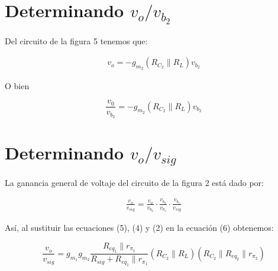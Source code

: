 \documentclass[12pt]{article}
\begin{document}
	\section*{Determinando $v_o / v_{b_2}$}
	Del circuito de la figura 5 tenemos que:
	
	\begin{align*}
		v_o = -g_{m_2} \left( R_{C_2} \parallel R_L \right)v_{b_2}
	\end{align*} 
	
	\noindent O bien
	\begin{tcolorbox}[colback=red!5!white,colframe=red!75!black,arc=0mm,boxrule=0mm,width=(\linewidth+0.5cm)]
		\begin{equation}
			\frac{v_0}{v_{b_2}} = -g_{m_2} \left( R_{C_2} \parallel R_L \right)v_{b_2}
		\end{equation}
	\end{tcolorbox}
	
	\section*{Determinando $v_o / v_{sig}$}
	La ganancia general de voltaje del circuito de la figura 2 está dado por:
	
	\begin{align}
		\frac{v_o}{v_{sig}} = \frac{v_o}{v_{b_2}} \cdot \frac{v_{b_2}}{v_{b_1}} \cdot \frac{v_{b_1}}{v_{sig}}	
	\end{align}
	
	\noindent Así, al sustituir las ecuaciones (5), (4) y (2) en la ecuación (6) obtenemos:
	\begin{tcolorbox}[colback=red!5!white,colframe=red!75!black,arc=0mm,boxrule=0mm,width=(\linewidth+0.5cm)]
		\begin{equation}
			\frac{v_o}{v_{sig}} = g_{m_1} g_{m_2} \frac{R_{eq_1} \parallel r_{\pi_1}}{R_{sig} + R_{eq_1} \parallel r_{\pi_1}} \left( R_{C_2} \parallel R_L \right) \left( R_{C_2} \parallel R_{eq_2} \parallel r_{\pi_2} \right)
		\end{equation}
	\end{tcolorbox}
	
\end{document}
